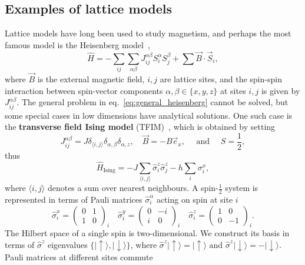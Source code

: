 \subsection{Examples of lattice models}
\label{subsec:latt-examples}
Lattice models have long been used to study magnetism, and perhaps the most famous model is the Heisenberg model~\cite{heisenberg1985theorie},
\begin{equation}
\label{eq:general_heisenberg}
\hat H = -\sum_{ij} \sum_{\alpha\beta} J^{\alpha \beta}_{ij} S^{\alpha}_{i} S^{\beta}_{j} + \sum \vec{B}\cdot \vec{S}_i,
\end{equation}
where $\vec{B}$ is the external magnetic field, $i, j$ are lattice sites, and the spin-spin interaction between spin-vector components $\alpha, \beta \in \{x, y, z\}$ at sites $i, j$ is given by $J^{\alpha \beta}_{ij}$. The general problem in eq.~\eqref{eq:general_heisenberg} cannot be solved, but some special cases in low dimensions have analytical solutions. One such case is the \textbf{transverse field Ising model} (TFIM)~\cite{de1963collective}, which is obtained by setting
\begin{equation}
	J^{\alpha \beta}_{ij} = J \delta_{\langle i, j \rangle} \delta_{\alpha, \beta} \delta_{\alpha, z}, \quad \vec{B} = -B \vec{e}_x, \quad \text{ and } \quad S = \frac{1}{2},
\end{equation}
thus
\begin{equation}
	\label{eq:h-ising}
	\hat H_{\mathrm{Ising}}=-J \sum_{\langle i, j\rangle} \hat{\sigma}^z_{i} \hat{\sigma}^z_{j}-h \sum_{i} \sigma^x_{i},
\end{equation}
where $\langle i, j\rangle$ denotes a sum over nearest neighbours. A spin-$\frac{1}{2}$ system is represented in terms of Pauli matrices $\hat \sigma_i^{\alpha}$ acting on spin at site $i$
\begin{equation}
\hat{\sigma}^x_{i}=\left(\begin{array}{cc}0 & 1 \\ 1 & 0\end{array}\right)_{i} \quad \hat{\sigma}^y_{i}=\left(\begin{array}{cc}0 & -i \\ i & 0\end{array}\right)_{i} \quad \hat{\sigma}^z_{i}=\left(\begin{array}{cc}1 & 0 \\ 0 & -1\end{array}\right)_{i}.
\end{equation}
The Hilbert space of a single spin is two-dimensional. We construct its basis in terms of $\hat \sigma^z$ eigenvalues $\{|\uparrow\rangle,|\downarrow\rangle\}$, where $\hat{\sigma}^{z}|\uparrow\rangle=|\uparrow\rangle \text { and } \hat{\sigma}^{z}|\downarrow\rangle=-|\downarrow\rangle$. Pauli matrices at different sites commute
